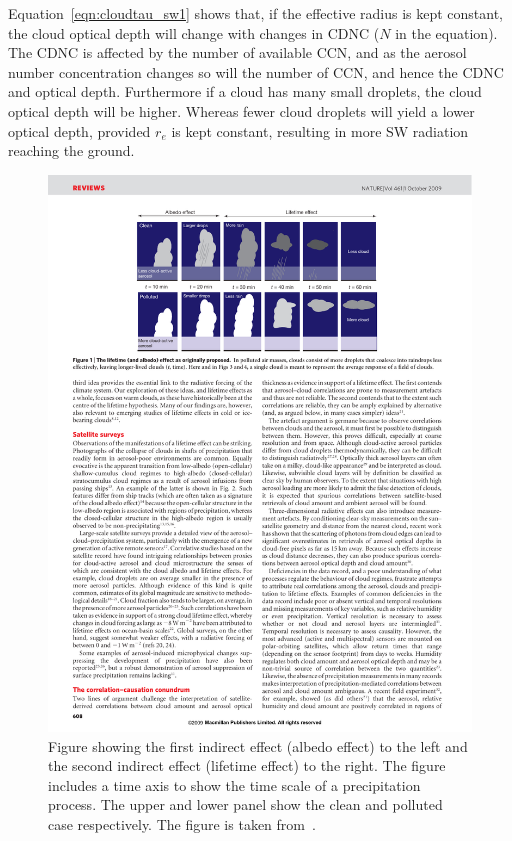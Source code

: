 Equation~\ref{eqn:cloudtau_sw1} shows that, if the effective radius is kept constant, the cloud optical depth will change with changes in CDNC ($N$ in the equation). The CDNC is affected by the number of available CCN, and as the aerosol number concentration changes so will the number of CCN, and hence the CDNC and optical depth. Furthermore if a cloud has many small droplets, the cloud optical depth will be higher. Whereas fewer cloud droplets will yield a lower optical depth, provided $r_e$ is kept constant, resulting in more SW radiation reaching the ground.

\begin{figure}
\centering
\includegraphics[width=1.1\textwidth]{theory/indirecteffects.pdf}
\caption{Figure showing the first indirect effect (albedo effect) to the left and the second indirect effect (lifetime effect) to the right. The figure includes a time axis to show the time scale of a precipitation process. The upper and lower panel show the clean and polluted case respectively. The figure is taken from~\cite{Stevens2009}.}
\label{fig:indirecteffects}
\end{figure}

